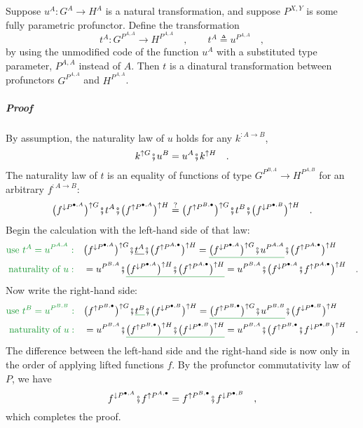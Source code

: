 Suppose $u^{A}:G^{A}\rightarrow H^{A}$ is a natural transformation,
and suppose $P^{X,Y}$ is some fully parametric profunctor. Define
the transformation
\[
t^{A}:G^{P^{A,A}}\rightarrow H^{P^{A,A}}\quad,\quad\quad t^{A}\triangleq u^{P^{A,A}}\quad,
\]
by using the unmodified code of the function $u^{A}$ with a substituted
type parameter, $P^{A,A}$ instead of $A$. Then $t$ is a dinatural
transformation between profunctors $G^{P^{A,A}}$ and $H^{P^{A,A}}$.

\subparagraph{Proof}

By assumption, the naturality law of $u$ holds for any $k^{:A\rightarrow B}$,
\[
k^{\uparrow G}\bef u^{B}=u^{A}\bef k^{\uparrow H}\quad.
\]
The naturality law of $t$ is an equality of functions of type $G^{P^{B,A}}\rightarrow H^{P^{A,B}}$
for an arbitrary $f^{:A\rightarrow B}$:
\[
\big(f^{\downarrow P^{\bullet,A}}\big)^{\uparrow G}\bef t^{A}\bef\big(f^{\uparrow P^{\bullet,A}}\big)^{\uparrow H}\overset{?}{=}\big(f^{\uparrow P^{B,\bullet}}\big)^{\uparrow G}\bef t^{B}\bef\big(f^{\downarrow P^{\bullet,B}}\big)^{\uparrow H}\quad.
\]
Begin the calculation with the left-hand side of that law:
\begin{align*}
{\color{greenunder}\text{use }t^{A}=u^{P^{A,A}}:}\quad & \big(f^{\downarrow P^{\bullet,A}}\big)^{\uparrow G}\bef\underline{t^{A}}\bef\big(f^{\uparrow P^{A,\bullet}}\big)^{\uparrow H}=\gunderline{\big(f^{\downarrow P^{\bullet,A}}\big)^{\uparrow G}\bef u^{P^{A,A}}}\bef\big(f^{\uparrow P^{A,\bullet}}\big)^{\uparrow H}\\
{\color{greenunder}\text{naturality of }u:}\quad & =u^{P^{B,A}}\bef\gunderline{\big(f^{\downarrow P^{\bullet,A}}\big)^{\uparrow H}\bef\big(f^{\uparrow P^{A,\bullet}}\big)^{\uparrow H}}=u^{P^{B,A}}\bef\big(f^{\downarrow P^{\bullet,A}}\bef f^{\uparrow P^{A,\bullet}}\big)^{\uparrow H}\quad.
\end{align*}
Now write the right-hand side:
\begin{align*}
{\color{greenunder}\text{use }t^{B}=u^{P^{B,B}}:}\quad & \big(f^{\uparrow P^{B,\bullet}}\big)^{\uparrow G}\bef\gunderline{t^{B}}\bef\big(f^{\downarrow P^{\bullet,B}}\big)^{\uparrow H}=\gunderline{\big(f^{\uparrow P^{B,\bullet}}\big)^{\uparrow G}\bef u^{P^{B,B}}}\bef\big(f^{\downarrow P^{\bullet,B}}\big)^{\uparrow H}\\
{\color{greenunder}\text{naturality of }u:}\quad & =u^{P^{B,A}}\bef\gunderline{\big(f^{\uparrow P^{B,\bullet}}\big)^{\uparrow H}\bef\big(f^{\downarrow P^{\bullet,B}}\big)^{\uparrow H}}=u^{P^{B,A}}\bef\big(f^{\uparrow P^{B,\bullet}}\bef f^{\downarrow P^{\bullet,B}}\big)^{\uparrow H}\quad.
\end{align*}
The difference between the left-hand side and the right-hand side
is now only in the order of applying lifted functions $f$. By the
profunctor commutativity law of $P$, we have
\[
f^{\downarrow P^{\bullet,A}}\bef f^{\uparrow P^{A,\bullet}}=f^{\uparrow P^{B,\bullet}}\bef f^{\downarrow P^{\bullet,B}}\quad,
\]
which completes the proof.

